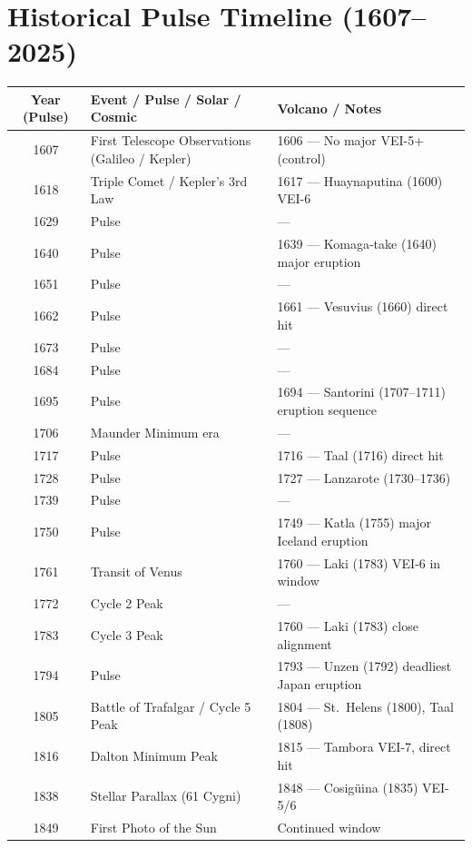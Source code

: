 \documentclass[11pt,a4paper]{article}
\begin{document}
\section{Historical Pulse Timeline (1607--2025)}
\begin{longtable}{|c|p{5cm}|p{5cm}|}
\hline
\textbf{Year (Pulse)} & \textbf{Event / Pulse / Solar / Cosmic} & \textbf{Volcano / Notes} \\ \hline
1607 & First Telescope Observations (Galileo / Kepler) & 1606 --- No major VEI-5+ (control) \\ \hline
1618 & Triple Comet / Kepler's 3rd Law & 1617 --- Huaynaputina (1600) VEI-6 \\ \hline
1629 & Pulse & --- \\ \hline
1640 & Pulse & 1639 --- Komaga-take (1640) major eruption \\ \hline
1651 & Pulse & --- \\ \hline
1662 & Pulse & 1661 --- Vesuvius (1660) direct hit \\ \hline
1673 & Pulse & --- \\ \hline
1684 & Pulse & --- \\ \hline
1695 & Pulse & 1694 --- Santorini (1707--1711) eruption sequence \\ \hline
1706 & Maunder Minimum era & --- \\ \hline
1717 & Pulse & 1716 --- Taal (1716) direct hit \\ \hline
1728 & Pulse & 1727 --- Lanzarote (1730--1736) \\ \hline
1739 & Pulse & --- \\ \hline
1750 & Pulse & 1749 --- Katla (1755) major Iceland eruption \\ \hline
1761 & Transit of Venus & 1760 --- Laki (1783) VEI-6 in window \\ \hline
1772 & Cycle 2 Peak & --- \\ \hline
1783 & Cycle 3 Peak & 1760 --- Laki (1783) close alignment \\ \hline
1794 & Pulse & 1793 --- Unzen (1792) deadliest Japan eruption \\ \hline
1805 & Battle of Trafalgar / Cycle 5 Peak & 1804 --- St.\ Helens (1800), Taal (1808) \\ \hline
1816 & Dalton Minimum Peak & 1815 --- Tambora VEI-7, direct hit \\ \hline
1838 & Stellar Parallax (61 Cygni) & 1848 --- Cosig\"uina (1835) VEI-5/6 \\ \hline
1849 & First Photo of the Sun & Continued window \\ \hline

\end{longtable}
\end{document}
